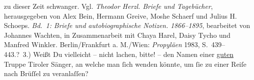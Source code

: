 \begin{ledgroupsized}[t]{13cm}
{{{                     zu dieser Zeit schwanger. Vgl. \emph{Theodor Herzl. Briefe und
                        Tagebücher}, herausgegeben von Alex Bein, Hermann Greive, Moshe Schaerf und
                        Julius H. Schoeps. \emph{Bd. 1: Briefe und autobiographische
                           Notizen. 1866–1895}, bearbeitet von Johannes Wachten, in
                        Zusammenarbeit mit Chaya Harel, Daisy Tycho und Manfred Winkler.
                        Berlin/Frankfurt a. M./Wien:
                           \emph{Propyläen}{ }1983, S. 439–443.}}}\label{K_L02669-13h}? 3.) Weißt Du
                  vielleicht – nicht lachen, bitte! – den Namen einer \uline{guten}{ } Truppe Tiroler Sänger, \introOben{}an\introOben{} welche man ſich wenden könnte, um ſie zu einer Reiſe
                  nach Brüſſel zu veranlaſſen?\pend
           
         
         \endnumbering{}\end{ledgroupsized}  \newcommand{\dateiname}{L02669}\newcommand{\titel}{Paul Goldmann an Arthur Schnitzler, 27. 10. 1891}\newcommand{\editorInnen}{Martin Anton Müller und Laura Untner}
      